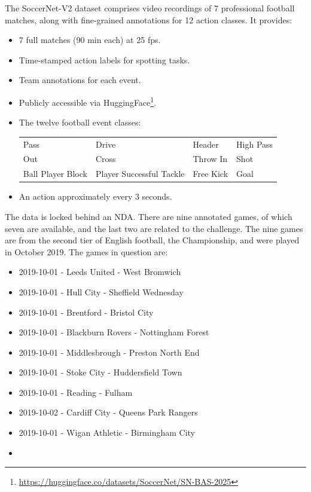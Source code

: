 The SoccerNet-V2 dataset \cite{deliege_soccernet-v2_dataset_2021} comprises video recordings of 7 professional football matches, along with fine-grained annotations for 12 action classes. It provides:
\begin{itemize}
    \item 7 full matches (90 min each) at 25 fps.
    \item Time-stamped action labels for spotting tasks.
    \item Team annotations for each event.
    \item Publicly accessible via HuggingFace\footnote{\url{https://huggingface.co/datasets/SoccerNet/SN-BAS-2025}}.
    \item The twelve football event classes:
        \begin{center}
            \begin{tabular}{llll}
                Pass & Drive & Header & High Pass \\
                Out & Cross & Throw In & Shot \\
                Ball Player Block & Player Successful Tackle & Free Kick & Goal
            \end{tabular}
        \end{center}
    \item An action approximately every 3 seconds. 
\end{itemize}

The data is locked behind an NDA. There are nine annotated games, of which seven are available, and the last two are related to the challenge. The nine games are from the second tier of English football, the Championship, and were played in October 2019. The games in question are: 

\begin{itemize}
    \item 2019-10-01 - Leeds United - West Bromwich
    \item 2019-10-01 - Hull City - Sheffield Wednesday
    \item 2019-10-01 - Brentford - Bristol City
    \item 2019-10-01 - Blackburn Rovers - Nottingham Forest
    \item 2019-10-01 - Middlesbrough - Preston North End
    \item 2019-10-01 - Stoke City - Huddersfield Town
    \item 2019-10-01 - Reading - Fulham
    \item 2019-10-02 - Cardiff City - Queens Park Rangers
    \item 2019-10-01 - Wigan Athletic - Birmingham City
    \item 
\end{itemize}

